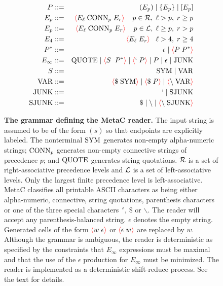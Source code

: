 \documentclass{article}
\newcommand{\fopen}{{\color{red} \langle}}
\newcommand{\fclose}{{\color{red} \rangle}}
\begin{document}
\begin{figure}
  
\begin{eqnarray*}
  P & ::= & (E_p) \;|\; \{E_p\} \;|\; [E_p] \\
  E_p & ::= & \fopen  E_\ell\;\conn_p \;E_r\fclose\;\;\;\;p \in {\cal R}, \;\ell > p, \; r \geq p \\
  E_p & ::= & \fopen E_\ell\;\conn_p \;E_r\fclose\;\;\;\;p \in {\cal L}, \; \ell \geq p,\; r > p \\
  E_4 & ::= & \fopen E_\ell \;E_r\fclose \;\;\;\ell > 4,\;r \geq 4\\
  P^* & ::= &  \epsilon  \;|\; \fopen P\;P^* \fclose \\
  E_\infty & ::= & \quot \;|\; \fopen S \; \;P^* \fclose \;|\; \fopen `\;P\fclose \;|\; P \;|\; \epsilon \;|\; \mathrm{JUNK}\\
  S & ::= & \;\sym \;|\; \var \\
  \var & ::= & \fopen \$\;\sym\fclose \;|\; \fopen \$\;P\fclose \;|\; \fopen \backslash \; \var \fclose\\
  \mathrm{JUNK} & ::= & ` \;|\; \mathrm{SJUNK} \\
  \mathrm{SJUNK} & :: = & \$ \;|\;  \backslash \;|\; \fopen \backslash\;\mathrm{SJUNK} \fclose\\
\end{eqnarray*}

\caption{{\bf The grammar defining the MetaC reader.} The input string is assumed to be of the form $(s)$ so that endpoints are explicitly labeled.
The nonterminal $\mathrm{SYM}$ generates non-empty alpha-numeric strings; $\mathrm{CONN}_p$ generates non-empty connective
strings of precedence $p$; and $\mathrm{QUOTE}$ generates string quotations.  ${\cal R}$ is a set of right-associative precedence levels and ${\cal L}$ is a set of left-associative levels.
Only the largest finite precedence level is left-associative. MetaC classifies all printable ASCII characters as being either alpha-numeric, connective, string quotations, parenthesis characters or one of the three special characters
{\tt `}, $\$$ or $\backslash$.
The reader will accept any parenthesis-balanced string. $\epsilon$ denotes the empty string. Generated cells of the form $\fopen w\;\epsilon \fclose$ or $\fopen \epsilon \;w\fclose$ are replaced by $w$.
Although the grammar is ambiguous, the reader is deterministic as specified by the constraints that
$E_\infty$ expressions must be maximal and that the use of the $\epsilon$ production for $E_\infty$ must be minimized.  The reader is implemented as a deterministic shift-reduce process.
See the text for details.
  }
\label{fig:grammar}
\end{figure}
\end{document}
